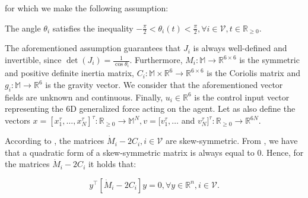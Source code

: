 for which we make the following assumption:

\begin{assumption} \label{as:J}
	The angle $\theta_i$ satisfies the inequality
  $-\frac{\pi}{2} < \theta_i(t) < \frac{\pi}{2} ,\forall i\in\mathcal{V},t\in\mathbb{R}_{\geq 0}$.
\end{assumption}

The aforementioned assumption guarantees that $J_i$ is always well-defined and
invertible, since $\det(J_i) = \tfrac{1}{\cos\theta_i}$.
Furthermore, $M_i:\mathbb{M} \to \mathbb{R}^{6\times6}$ is the symmetric and
positive definite inertia matrix,
$C_i:\mathbb{M}\times\mathbb{R}^6 \to \mathbb{R}^{6\times6}$ is the Coriolis
matrix and $g_i:\mathbb{M} \to \mathbb{R}^6$ is the gravity vector.
We consider that the aforementioned vector fields are unknown and continuous.
Finally, $u_i\in\mathbb{R}^6$ is the control input vector representing the $6$D
generalized force acting on the agent. Let as also define the vectors
$x = [x_1^\tau,\dots,x_N^\tau]^\tau : \mathbb{R}_{\geq 0} \to \mathbb{M}^N, v = [v_1^\tau, \dots$
and $v_N^\tau]^\tau : \mathbb{R}_{\geq 0} \to \mathbb{R}^{6N}$.

\begin{remark}
	According to \cite{Siciliano2009}, the matrices
  $\dot{M}_i - 2C_i, i \in \mathcal{V}$ are skew-symmetric.
  From \cite{horn_jonshon}, we have that a quadratic form of a skew-symmetric
  matrix is always equal to $0$. Hence, for the matrices $\dot{M}_i - 2C_i$ it
  holds that:

	\begin{equation} \label{eq:skew_symm}
	y^\top \left[\dot{M}_i - 2 C_i\right]y = 0, \forall y \in \mathbb{R}^n, i \in \mathcal{V}.
	\end{equation}

\end{remark}

